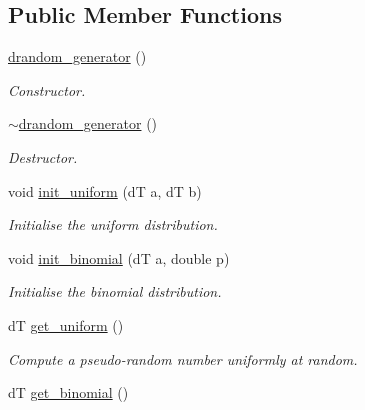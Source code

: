 \subsection*{Public Member Functions}
\begin{DoxyCompactItemize}
\item 
\hypertarget{classlgraph_1_1utils_1_1drandom__generator_a3029c9cb8b6e73b0e0f0ca5fbc33c6ea}{\hyperlink{classlgraph_1_1utils_1_1drandom__generator_a3029c9cb8b6e73b0e0f0ca5fbc33c6ea}{drandom\-\_\-generator} ()}\label{classlgraph_1_1utils_1_1drandom__generator_a3029c9cb8b6e73b0e0f0ca5fbc33c6ea}

\begin{DoxyCompactList}\small\item\em Constructor. \end{DoxyCompactList}\item 
\hypertarget{classlgraph_1_1utils_1_1drandom__generator_a09711a23359454bf60cefb2e0be64a0a}{\hyperlink{classlgraph_1_1utils_1_1drandom__generator_a09711a23359454bf60cefb2e0be64a0a}{$\sim$drandom\-\_\-generator} ()}\label{classlgraph_1_1utils_1_1drandom__generator_a09711a23359454bf60cefb2e0be64a0a}

\begin{DoxyCompactList}\small\item\em Destructor. \end{DoxyCompactList}\item 
void \hyperlink{classlgraph_1_1utils_1_1drandom__generator_a38c5b5c981d635aac32f632a0f4a0092}{init\-\_\-uniform} (d\-T a, d\-T b)
\begin{DoxyCompactList}\small\item\em Initialise the uniform distribution. \end{DoxyCompactList}\item 
void \hyperlink{classlgraph_1_1utils_1_1drandom__generator_acae17810176a40fdfd8a4a260892361e}{init\-\_\-binomial} (d\-T a, double p)
\begin{DoxyCompactList}\small\item\em Initialise the binomial distribution. \end{DoxyCompactList}\item 
\hypertarget{classlgraph_1_1utils_1_1drandom__generator_a7735e31610688246957518795169bae3}{d\-T \hyperlink{classlgraph_1_1utils_1_1drandom__generator_a7735e31610688246957518795169bae3}{get\-\_\-uniform} ()}\label{classlgraph_1_1utils_1_1drandom__generator_a7735e31610688246957518795169bae3}

\begin{DoxyCompactList}\small\item\em Compute a pseudo-\/random number uniformly at random. \end{DoxyCompactList}\item 
\hypertarget{classlgraph_1_1utils_1_1drandom__generator_ac6062b1bbf3ed3a45bdab7474f466b7f}{d\-T \hyperlink{classlgraph_1_1utils_1_1drandom__generator_ac6062b1bbf3ed3a45bdab7474f466b7f}{get\-\_\-binomial} ()}\label{classlgraph_1_1utils_1_1drandom__generator_ac6062b1bbf3ed3a45bdab7474f466b7f}


\end{DoxyCompactItemize}
